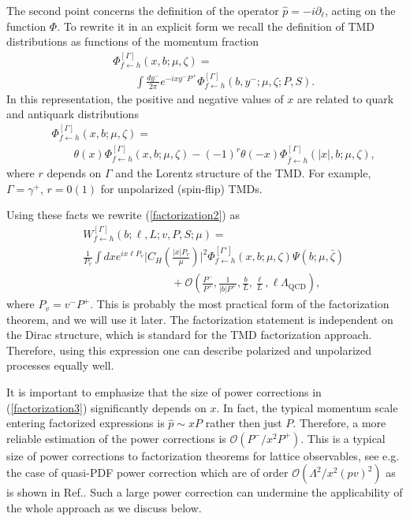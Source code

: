 \documentclass[a4paper, amsfonts, amssymb, amsmath, reprint, showkeys, nofootinbib, twoside]{revtex4-1}
\newcommand{\nn}{\nonumber}
\newcommand{\ot}{\leftarrow}
\renewcommand{\(}{\left(}
\renewcommand{\)}{\right)}
\renewcommand{\[}{\left[}
\renewcommand{\]}{\right]}
\begin{document}
The second point concerns the definition of the operator $\hat p=-i\partial_\ell$, acting on the function $\Phi$. To rewrite it in an explicit form we recall the definition of TMD distributions as functions of the momentum fraction
\begin{eqnarray}
&&\Phi_{f\ot h}^{[\Gamma ]}(x,b;\mu,\zeta)
=
\\\nn&& \qquad\int \frac{dy^-}{2\pi}e^{-ixy^-P^+}\Phi_{f\ot h}^{[\Gamma]}(b,y^-;\mu,\zeta;P,S).
\end{eqnarray}
In this representation, the positive and negative values of $x$ are related to quark and antiquark distributions
\begin{eqnarray}
&&\Phi^{[\Gamma ]}_{f\ot h}(x,b;\mu,\zeta)=
\\\nn &&\qquad\theta(x)\Phi^{[\Gamma ]}_{f\ot h}(x,b;\mu,\zeta)-(-1)^r \theta(-x)\Phi^{[\Gamma ]}_{\bar f\ot h}(|x|,b;\mu,\zeta),
\end{eqnarray}
where $r$ depends on $\Gamma$ and the Lorentz structure of the TMD. For example, $\Gamma=\gamma^+$, $r=0(1)$ for unpolarized (spin-flip) TMDs.  

Using these facts we rewrite (\ref{factorization2}) as
\begin{eqnarray}\label{factorization3}
&&W^{[\Gamma]}_{f\ot h}(b;\ell,L;v,P,S;\mu)=
\\\nn &&\frac{1}{P_v}\int dx e^{ix\ell P_v}\Big|C_H\(\frac{|x| P_v}{\mu}\)\Big|^2\Phi_{f\ot h}^{[\Gamma']}(x,b;\mu,\zeta)
\Psi(b;\mu,\bar \zeta)
\\\nn &&\qquad\qquad\qquad\qquad
+\mathcal{O}\(\frac{P^-}{P^+},\frac{1}{|b|P^+},\frac{b}{L},\frac{\ell}{L},\ell\Lambda_{\text{QCD}}\),
\end{eqnarray}
where $P_v=v^-P^+$. This is probably the most practical form of the factorization theorem, and we will use it later. The factorization statement is independent on the Dirac structure, which is standard for the TMD factorization approach. Therefore, using this expression one can describe polarized and unpolarized processes equally well.

It is important to emphasize that the size of power corrections in (\ref{factorization3}) significantly depends on $x$. In fact, the typical momentum scale entering factorized expressions is $\hat p\sim x P$ rather then just $P$. Therefore, a more reliable estimation of the power corrections is $\mathcal{O}(P^-/x^2P^+)$. This is a typical size of power corrections to factorization theorems for lattice observables, see e.g. the case of quasi-PDF power correction which are of order  $\mathcal{O}(\Lambda^2/x^2(pv)^2)$ as is shown in Ref.\cite{Braun:2018brg}. Such a large power correction can undermine the applicability of the whole approach as we discuss below.
\end{document}
